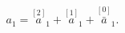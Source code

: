 \begin{equation}
a_{1}=\stackrel{[2]}{a}_{1}+\stackrel{[1]}{a}_{1}+\stackrel{[0]}{\bar{a}}%
_{1}.  \label{bf78d}
\end{equation}

